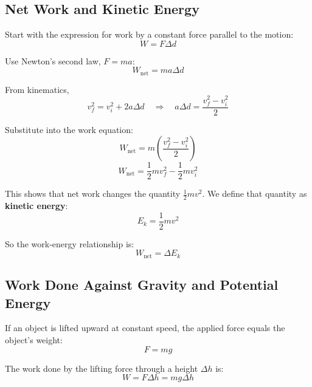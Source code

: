 \subsection{Net Work and Kinetic Energy}
Start with the expression for work by a constant force parallel to the motion:
\begin{equation*}
    W = F \Delta d
\end{equation*}

Use Newton's second law, $F = ma$:
\begin{equation*}
    W_{\text{net}} = ma \Delta d
\end{equation*}

From kinematics,
\begin{equation*}
    v_f^2 = v_i^2 + 2a \Delta d
    \quad \Rightarrow \quad
    a \Delta d = \frac{v_f^2 - v_i^2}{2}
\end{equation*}

Substitute into the work equation:
\begin{equation*}
    W_{\text{net}} = m\left( \frac{v_f^2 - v_i^2}{2} \right)
\end{equation*}
\begin{equation*}
    W_{\text{net}} = \frac{1}{2}mv_f^2 - \frac{1}{2}mv_i^2
\end{equation*}

This shows that net work changes the quantity $\frac{1}{2}mv^2$. We define that quantity as \textbf{kinetic energy}:
\begin{equation}
    E_k = \frac{1}{2}mv^2
\end{equation}

So the work-energy relationship is:
\begin{equation}
    W_{\text{net}} = \Delta E_k
\end{equation}

\subsection{Work Done Against Gravity and Potential Energy}
If an object is lifted upward at constant speed, the applied force equals the object's weight:
\begin{equation*}
    F = mg
\end{equation*}

The work done by the lifting force through a height $\Delta h$ is:
\begin{equation*}
    W = F \Delta h = mg \Delta h
\end{equation*}

